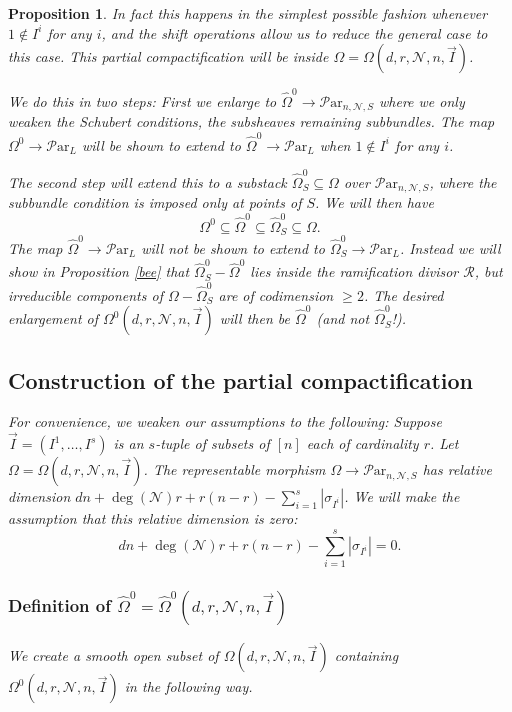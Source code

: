 \documentclass[11pt]{amsart}
\newcommand\mn{\mathcal{N}}
\newcommand\ParL{\mathcal{P}\text{ar}_L}
\newcommand\Par{\mathcal{P}\text{ar} }
\newtheorem{proposition}[theorem]{Proposition}
\numberwithin{theorem}{subsection}
\begin{document}
{\begin{proposition}
In fact this happens in the simplest possible fashion whenever $1\not\in I^i$ for any $i$, and the shift operations allow us to reduce the general case to this case. This partial compactification will be inside $\Omega=\Omega(d,r,\mn,n,\vec{I})$.

 We do this in two steps: First we enlarge to $\widehat{\Omega}^0\to \Par_{n,\mn,S}$ where we only weaken the Schubert conditions, the subsheaves remaining subbundles. The map   $\Omega^0\to \ParL$ will be shown to extend to $\widehat{\Omega}^0\to \ParL$ when $1\not\in I^i$ for any $i$.

The second step will extend this to a substack  $\widehat{\Omega}_{S}^0\subseteq \Omega$ over $\Par_{n,\mn,S}$, where the subbundle condition is imposed only at points of $S$. We will then have
$$\Omega^0\subseteq \widehat{\Omega}^0\subseteq \widehat{\Omega}_{S}^0\subseteq \Omega.$$ The map $\widehat{\Omega}^0\to \ParL$ will not be shown to extend to $\widehat{\Omega}_{S}^0\to \ParL$. Instead we will show in Proposition \ref{bee} that   $\widehat{\Omega}_{S}^0-  \widehat{\Omega}^0$ lies inside the ramification divisor $\mathcal{R}$, but  irreducible components of $\Omega-\widehat{\Omega}_{S}^0$ are of codimension $\geq 2$. The desired enlargement of $\Omega^0(d,r,\mn,n,\vec{I})$ will then be $\widehat{\Omega}^0$ (and not $\widehat{\Omega}_{S}^0$!).
\subsection{Construction of the partial compactification}
For convenience, we weaken our assumptions to the following:
Suppose $\vec{I}=(I^1,\dots,I^s)$ is an $s$-tuple of subsets  of $[n]$ each of cardinality $r$. Let $\Omega=\Omega(d,r,\mn,n,\vec{I})$.  The representable morphism $\Omega\to \Par_{n,\mn,S}$ has relative dimension $dn +\deg(\mn)r +r(n-r)-\sum_{i=1}^s |\sigma_{I^i}|$. We will make the assumption that this relative dimension is zero:
\begin{equation}\label{timer}
dn +\deg(\mn)r +r(n-r)-\sum_{i=1}^s |\sigma_{I^i}|=0.
\end{equation}

\subsubsection{Definition of $\widehat{\Omega}^0=\widehat{\Omega}^0(d,r,\mn,n,\vec{I})$}\label{bruckner92}
We create a  smooth open subset of $\Omega(d,r,\mn,n,\vec{I})$ containing $\Omega^0(d,r,\mn,n,\vec{I})$ in the following way.


\end{proposition}}
\end{document}
